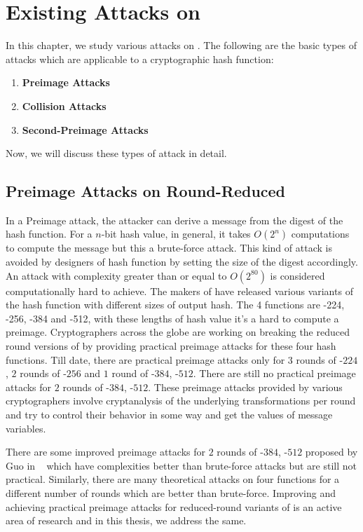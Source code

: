 \chapter{Existing Attacks on \KECCAK}

In this chapter, we study various attacks on \KECCAK{}. The following are the basic types of attacks which are applicable to a cryptographic hash function:

\begin{enumerate}
    \item \textbf{Preimage Attacks}
    \item \textbf{Collision Attacks}
    \item \textbf{Second-Preimage Attacks}
\end{enumerate}
Now, we will discuss these types of attack in detail.

\section{Preimage Attacks on Round-Reduced \KECCAK{}}

In a Preimage attack, the attacker can derive a message from the digest of the hash function. For a $n$-bit hash value, in general, it takes $O(2^{n})$ computations to compute the message but this a brute-force attack. This kind of attack is avoided by designers of hash function by setting the size of the digest accordingly. An attack with complexity greater than or equal to $O(2^{80})$ is considered computationally hard to achieve. The makers of \KECCAK{} have released various variants of the hash function  with different sizes of output hash. The 4  functions are -224, -256, -384 and -512, with these lengths of hash value it's a hard to compute a preimage. Cryptographers across the globe are working on breaking the reduced round versions of \KECCAK{} by providing practical preimage attacks for these four  hash functions. Till date, there are practical preimage attacks only for $3$ rounds of \KECCAK-$224$, $2$ rounds of \KECCAK-$256$ and $1$ round of \KECCAK-$384$, \KECCAK-$512$. There are still no practical preimage attacks for $2$ rounds of \KECCAK-$384$, \KECCAK-$512$. These preimage attacks provided by various cryptographers involve cryptanalysis of the underlying transformations per round and try to control their behavior in some way and get the values of message variables.

There are some improved preimage attacks for $2$ rounds of \KECCAK-$384$, \KECCAK-$512$ proposed by Guo \etal in ~\cite{guo2016linear} which have complexities better than brute-force attacks but are still not practical. Similarly, there are many theoretical attacks on four  functions for a different number of rounds which are better than brute-force. Improving and achieving practical preimage attacks for reduced-round variants of \KECCAK{} is an active area of research and in this thesis, we address the same.

